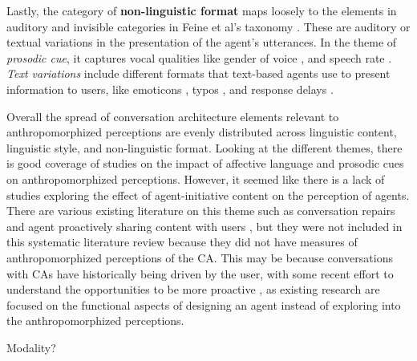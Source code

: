 \documentclass[sigconf,screen,review, anonymous]{acmart}
\newcommand{\cmt}[1]{}%
\begin{document}
Lastly, the category of \textbf{non-linguistic format} maps loosely to the elements in auditory and invisible categories in Feine et al's taxonomy \cite{feine2019taxonomy}. These are auditory or textual variations in the presentation of the agent's utterances. In the theme of \textit{prosodic cue}, it captures vocal qualities like gender of voice \cite{habler2019effects}\cmt{[63]}\cite{jestin2022effects}\cmt{[81]}, and speech rate \cite{choi2020nobody}\cmt{[54]}. \textit{Text variations} include different formats that text-based agents use to present information to users, like emoticons \cite{kim2019comparing}\cmt{[89]}\cite{wilhelm2022keep}\cmt{[28]}, typos \cite{westerman2019believe}\cmt{[9]}, and response delays \cite{gnewuch2022opposing}\cmt{[20]}\cite{seeger2021chatbots}\cmt{[35]}.

Overall the spread of conversation architecture elements relevant to anthropomorphized perceptions are evenly distributed across linguistic content, linguistic style, and non-linguistic format.  Looking at the different themes, there is good coverage of studies on the impact of affective language and prosodic cues on anthropomorphized perceptions. However, it seemed like there is a lack of studies exploring the effect of agent-initiative content on the perception of agents. There are various existing literature on this theme such as conversation repairs \cite{komatani2010online}\cite{reinkemeier2022repair} and agent proactively sharing content with users \cite{dubiel2019inquisitive}\cite{zargham2022understanding}, but they were not included in this systematic literature review because they did not have measures of anthropomorphized perceptions of the CA. This may be because conversations with CAs have historically being driven by the user, with some recent effort to understand the opportunities to be more proactive \cite{cowan2023introduction}, as existing research are focused on the functional aspects of designing an agent instead of exploring into the anthropomorphized perceptions.

Modality?
\end{document}
